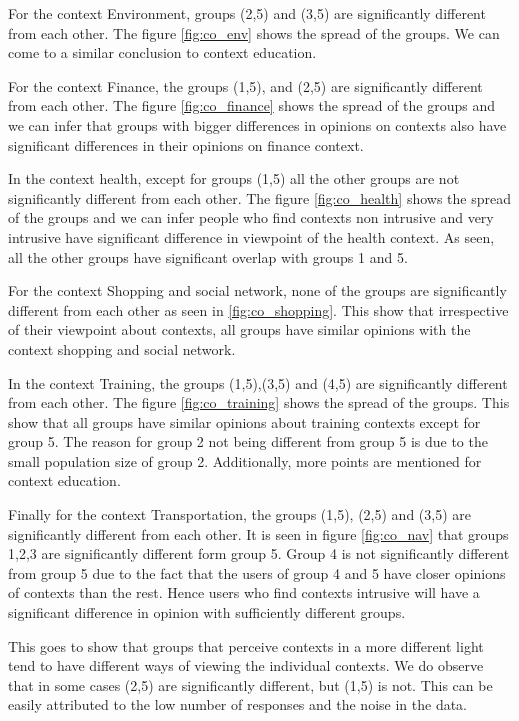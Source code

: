 For the context Environment, groups (2,5) and (3,5) are significantly different from each other. The figure \ref{fig:co_env} shows the spread of the groups. We can come to a similar conclusion to context education.

For the context Finance, the groups (1,5), and (2,5) are significantly different from each other. The figure \ref{fig:co_finance} shows the spread of the groups and we can infer that groups with bigger differences in opinions on contexts also have significant differences in their opinions on finance context.

In the context health, except for groups (1,5) all the other groups are not significantly different from each other. The figure \ref{fig:co_health} shows the spread of the groups and we can infer people who find contexts non intrusive and very intrusive have significant difference in viewpoint of the health context. As seen, all the other groups have significant overlap with groups 1 and 5.

For the context Shopping and social network, none of the groups are significantly different from each other as seen in \ref{fig:co_shopping}. This show that irrespective of their viewpoint about contexts, all groups have similar opinions with the context shopping and social network.

In the context Training, the groups (1,5),(3,5) and (4,5) are significantly different from each other. The figure \ref{fig:co_training} shows the spread of the groups. This show that all groups have similar opinions about training contexts except for group 5. The reason for group 2 not being different from group 5 is due to the small population size of group 2. Additionally, more points are mentioned for context education.

Finally for the context Transportation, the groups (1,5), (2,5) and (3,5) are significantly different from each other. It is seen in figure \ref{fig:co_nav} that groups 1,2,3 are significantly different form group 5. Group 4 is not significantly different from group 5 due to the fact that the users of group 4 and 5 have closer opinions of contexts than the rest. Hence users who find contexts intrusive will have a significant difference in opinion with sufficiently different groups.

This goes to show that groups that perceive contexts in a more different light tend to have different ways of viewing the individual contexts. We do observe that in some cases (2,5) are significantly different, but (1,5) is not. This can be easily attributed to the low number of responses
and the noise in the data.


